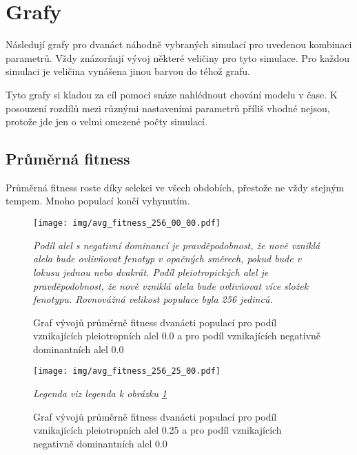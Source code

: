\section{Grafy}
\label{sec:graphs}

Následují grafy pro dvanáct náhodně vybraných simulací pro uvedenou kombinaci parametrů.
Vždy znázorňují vývoj některé veličiny pro tyto simulace. Pro každou simulaci je veličina
vynášena jinou barvou do téhož grafu.

Tyto grafy si kladou za cíl pomoci snáze nahlédnout chování modelu v čase. K posouzení rozdílů mezi
různými nastaveními parametrů příliš vhodné nejsou, protože jde jen o velmi omezené počty simulací.


\subsection{Průměrná fitness}

Průměrná fitness roste díky selekci ve všech obdobích, přestože ne vždy stejným tempem. Mnoho populací končí vyhynutím.

\begin{figure}[H]
\caption{Graf vývojů průměrně fitness dvanácti populací pro podíl vznikajících pleiotropních alel 0.0 a pro podíl
         vznikajících negativně dominantních alel 0.0}
\centering
\texttt{[image: img/avg\_fitness\_256\_00\_00.pdf]}

\label{fig:avg_fitness_256_0.0_0.0}

\textit{Podíl alel s negativní dominancí je pravděpodobnost, že nově vzniklá alela bude ovlivňovat fenotyp v opačných
        směrech, pokud bude v lokusu jednou nebo dvakrát. Podíl pleiotropických alel je pravděpodobnost, že nově vzniklá alela
        bude ovlivňovat více složek fenotypu. Rovnovážná velikost populace byla 256 jedinců.}

\end{figure}


\begin{figure}[H]
\caption{Graf vývojů průměrně fitness dvanácti populací pro podíl vznikajících pleiotropních alel 0.25 a pro podíl
        vznikajících negativně dominantních alel 0.0}
\centering
\texttt{[image: img/avg\_fitness\_256\_25\_00.pdf]}

\label{fig:avg_fitness_256_0.25_0.0}

\textit{Legenda viz legenda k obrázku \ref{fig:avg_fitness_256_0.0_0.0}}

\end{figure}

